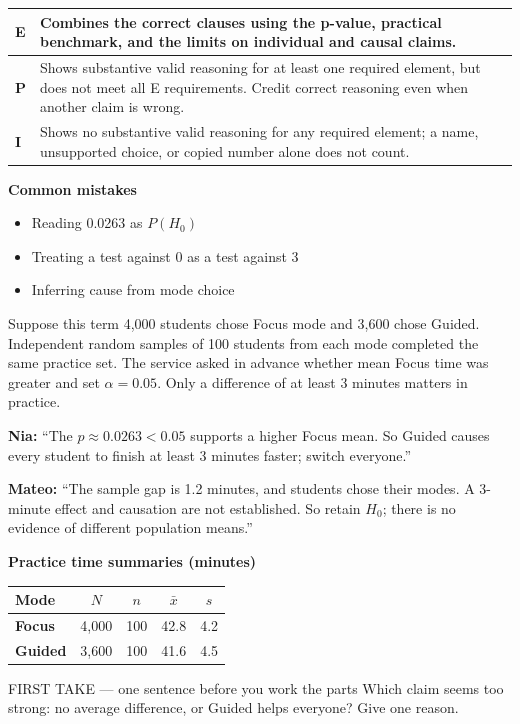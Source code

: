 \documentclass[11pt]{article}
\begin{document}
{\small\renewcommand{\arraystretch}{1.25}
\noindent\begin{tabular}{|p{0.5in}|p{5.9in}|}
\hline
\textbf{E} & Combines the correct clauses using the p-value, practical benchmark, and the limits on individual and causal claims. \\ \hline
\textbf{P} & Shows substantive valid reasoning for at least one required element, but does not meet all E requirements. Credit correct reasoning even when another claim is wrong. \\ \hline
\textbf{I} & Shows no substantive valid reasoning for any required element; a name, unsupported choice, or copied number alone does not count. \\ \hline
\end{tabular}}

\textbf{Common mistakes}
\begin{itemize}[leftmargin=1.5em,itemsep=2pt,topsep=2pt]
  \item Reading 0.0263 as $P(H_0)$
  \item Treating a test against 0 as a test against 3
  \item Inferring cause from mode choice
\end{itemize}

\clearpage
{}

Suppose this term 4{,}000 students chose Focus mode and 3{,}600 chose Guided. Independent random samples of 100 students from each mode completed the same practice set. The service asked in advance whether mean Focus time was greater and set $\alpha=0.05$. Only a difference of at least 3 minutes matters in practice.\par\smallskip \textbf{Nia:} ``The $p\approx0.0263<0.05$ supports a higher Focus mean. So Guided causes every student to finish at least 3 minutes faster; switch everyone.''\par \textbf{Mateo:} ``The sample gap is 1.2 minutes, and students chose their modes. A 3-minute effect and causation are not established. So retain $H_0$; there is no evidence of different population means.''\par
\begin{center}
\textbf{Practice time summaries (minutes)}\par\smallskip
\begin{tabular}{|l|c|c|c|c|}
\hline
\textbf{Mode} & \textbf{$N$} & \textbf{$n$} & \textbf{$\bar x$} & \textbf{$s$} \\ \hline
\textbf{Focus} & 4{,}000 & 100 & 42.8 & 4.2 \\ \hline
\textbf{Guided} & 3{,}600 & 100 & 41.6 & 4.5 \\ \hline
\end{tabular}
\end{center}
\begin{firsttakebox}{FIRST TAKE --- one sentence before you work the parts}
Which claim seems too strong: no average difference, or Guided helps everyone? Give one reason.\par
{}
\end{firsttakebox}
\end{document}
